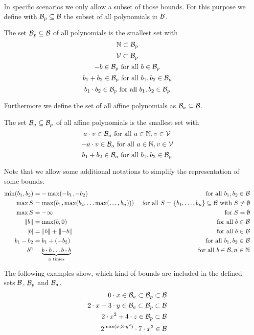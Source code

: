 In specific scenarios we only allow a subset of those bounds.
For this purpose we define with $\mathcal{B}_p \subseteq \mathcal{B}$ the subset of all polynomials in $\mathcal{B}$.
\begin{definition}
  The set $\mathcal{B}_p \subseteq \mathcal{B}$ of all polynomials is the smallest set with
  \[ \mathbb{N} \subset \mathcal{B}_p \] 
  \[ \mathcal{V} \subset \mathcal{B}_p \] 
  \[ -b \in \mathcal{B}_p \text{ for all } b \in \mathcal{B}_p \] 
  \[ b_1 + b_2 \in \mathcal{B}_p \text{ for all } b_1, b_2 \in \mathcal{B}_p \] 
  \[ b_1 \cdot b_2 \in \mathcal{B}_p \text{ for all } b_1, b_2 \in \mathcal{B}_p \] 
\end{definition}
Furthermore we define the set of all affine polynomials as $\mathcal{B}_a \subseteq \mathcal{B}$. 
\begin{definition}
  The set $\mathcal{B}_a \subseteq \mathcal{B}_p$ of all affine polynomials is the smallest set with
  \[ a \cdot v \in \mathcal{B}_a \text{ for all } a \in \mathbb{N}, v \in \mathcal{V} \] 
  \[ -a \cdot v \in \mathcal{B}_a \text{ for all } a \in \mathbb{N}, v \in \mathcal{V} \] 
  \[ b_1 + b_2 \in \mathcal{B}_a \text{ for all } b_1, b_2 \in \mathcal{B}_p \] 
\end{definition}

Note that we allow some additional notations to simplify the representation of some bounds.
\begin{align*}
  \min(b_1,b_2) &= -\max(-b_1,-b_2) & \text{ for all } b_1, b_2 \in \mathcal{B} \\
  \max S &= \max(b_1, \max(b_2, \dots \max(\dots, b_n))) & \text{ for all } S = \lbrace b_1, \dots, b_n \rbrace \subseteq \mathcal{B} \text{ with } S \neq \emptyset \\
  \max S &= -\infty & \text{ for } S = \emptyset \\
  \left\Vert b\right\Vert &= \max(b,0) & \text{ for all } b \in \mathcal{B} \\
  \left|b\right| &= \left\Vert b\right\Vert + \left\Vert-b\right\Vert & \text{ for all } b \in \mathcal{B} \\
  b_1 - b_2 &= b_1 + (-b_2) & \text{ for all } b_1, b_2 \in \mathcal{B} \\
  b^n &= \underbrace{b \cdot b \dots b \cdot b}_\text{n times} & \text{ for all } b \in \mathcal{B}, n \in \mathbb{N}
\end{align*}

The following examples show, which kind of bounds are included in the defined sets $\mathcal{B}$, $\mathcal{B}_p$ and $\mathcal{B}_a$.
\begin{align*}
  0 \cdot x \in \mathcal{B}_a \subset \mathcal{B}_p \subset \mathcal{B} \\
  2 \cdot x - 3 \cdot y \in \mathcal{B}_a \subset \mathcal{B}_p \subset \mathcal{B} \\
  2 \cdot x^2 + 4 \cdot z \in \mathcal{B}_p \subset \mathcal{B} \\
  2^{\max(x,3 \cdot y^2)} \cdot 7 \cdot x^3 \in \mathcal{B} \\
\end{align*}


